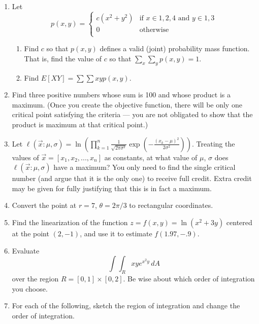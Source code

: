 \documentclass{article}
\begin{document}
\begin{enumerate}
                    \item Let  $$p(x,y) = \begin{cases} 
                        c(x^2+y^2) & \text{if $x\in {1, 2, 4}$ and $y\in{1, 3}$} \\
                        0 & \text{otherwise} \\
                        \end{cases}
                        $$
                        \begin{enumerate}
                            \item Find $c$ so that $p(x,y)$ defines a valid (joint) probability mass function.  That is, find the value of $c$ so that $ \sum_x \sum_y p(x, y) = 1$. 
                            \item Find $ E[XY] =\sum\sum xyp(x,y)$.
                        \end{enumerate}
                    \item Find three positive numbers whose sum is 100 and whose product is a maximum. (Once you create the objective function, there will be only one critical point satisfying the criteria --- you are not obligated to show that the product is maximum at that critical point.)
                    \item Let $ \ell(\vec{x}:\mu, \sigma) = \ln\left(\prod_{k=1}^{n} \frac{1}{\sqrt{2\pi\sigma^2}}\exp\left(-\frac{(x_k-\mu)^2}{2\sigma^2}\right)\right)$.  Treating the values of $\vec{x} = [x_1, x_2, ..., x_n]$ as constants, at what value of $\mu$, $\sigma$ does $\ell(\vec{x}:\mu, \sigma)$ have a maximum?  You only need to find the single critical number (and argue that it is the only one) to receive full credit. Extra credit may be given for fully justifying that this is in fact a maximum.
                    \item Convert the point at $r=7$, $\theta = 2\pi/3$ to rectangular coordinates.
                    \item Find the linearization of the function $ z=f(x,y) = \ln(x^2 +3y)$ centered at the point $(2, -1)$, and use it to estimate $f(1.97, -.9)$. 
         \item Evaluate $$\int\int_R xye^{x^2y}\,dA$$ 
         over the region $R = [0,1]\times [0,2]$. Be wise about which order of integration you choose.
         \item For each of the following, sketch the region of integration and change the order of integration.
         \begin{enumerate}
         

\end{enumerate}
\end{enumerate}
\end{document}

